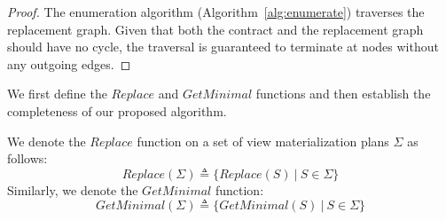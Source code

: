 \begin{proof}
    The enumeration algorithm (Algorithm~\ref{alg:enumerate}) traverses the replacement graph. Given that both the contract and the replacement graph should have no cycle, the traversal is guaranteed to terminate at nodes without any outgoing edges.
\end{proof}
    
% 

\medskip {}
We first define the $Replace$ and $GetMinimal$ functions and then establish the completeness of our proposed algorithm.

We denote the $Replace$ function on a set of view materialization plans $\Sigma$ as follows:
\[ Replace(\Sigma) \triangleq \{ Replace(S) ~|~ S \in \Sigma \} \]
Similarly, we denote the $GetMinimal$ function:
\[ GetMinimal(\Sigma) \triangleq \{ GetMinimal(S) ~|~ S \in \Sigma \} \]

